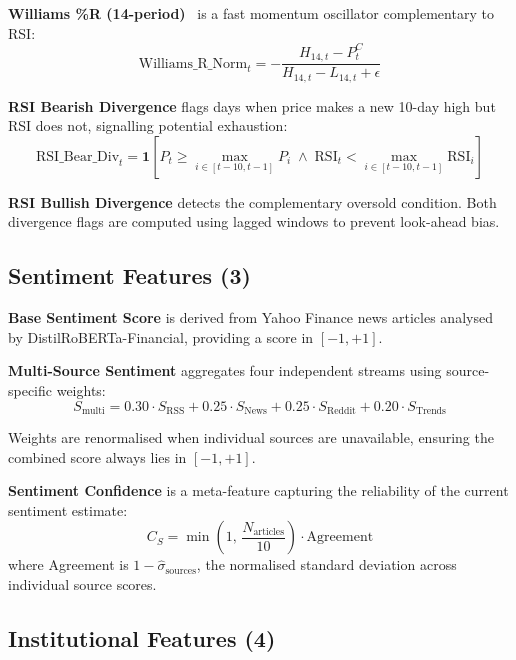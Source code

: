 \documentclass[10pt,a4paper,twoside]{article}
\begin{document}
\textbf{Williams \%R (14-period)}~\cite{williams1979} is a fast momentum
oscillator complementary to RSI:
\begin{equation}
  \text{Williams\_R\_Norm}_t = -\frac{H_{14,t} - P_t^C}{H_{14,t} - L_{14,t} + \epsilon}
\end{equation}

\textbf{RSI Bearish Divergence} flags days when price makes a new 10-day high
but RSI does not, signalling potential exhaustion:
\begin{equation}
  \text{RSI\_Bear\_Div}_t = \mathbf{1}\!\left[P_t \geq \max_{i \in [t-10,t-1]} P_i
  \;\wedge\; \text{RSI}_t < \max_{i \in [t-10,t-1]} \text{RSI}_i\right]
\end{equation}

\textbf{RSI Bullish Divergence} detects the complementary oversold condition.
Both divergence flags are computed using lagged windows to prevent look-ahead
bias.

\subsection{Sentiment Features (3)}

\textbf{Base Sentiment Score} is derived from Yahoo Finance news articles
analysed by DistilRoBERTa-Financial, providing a score in $[-1, +1]$.

\textbf{Multi-Source Sentiment} aggregates four independent streams using
source-specific weights:
\begin{equation}
  S_{\text{multi}} = 0.30 \cdot S_{\text{RSS}} + 0.25 \cdot S_{\text{News}}
                   + 0.25 \cdot S_{\text{Reddit}} + 0.20 \cdot S_{\text{Trends}}
\end{equation}

Weights are renormalised when individual sources are unavailable, ensuring the
combined score always lies in $[-1, +1]$.

\textbf{Sentiment Confidence} is a meta-feature capturing the reliability of
the current sentiment estimate:
\begin{equation}
  C_S = \min\!\left(1,\, \frac{N_{\text{articles}}}{10}\right)
        \cdot \text{Agreement}
\end{equation}
where Agreement is $1 - \hat{\sigma}_{\text{sources}}$, the normalised standard
deviation across individual source scores.

\subsection{Institutional Features (4)}
\end{document}

